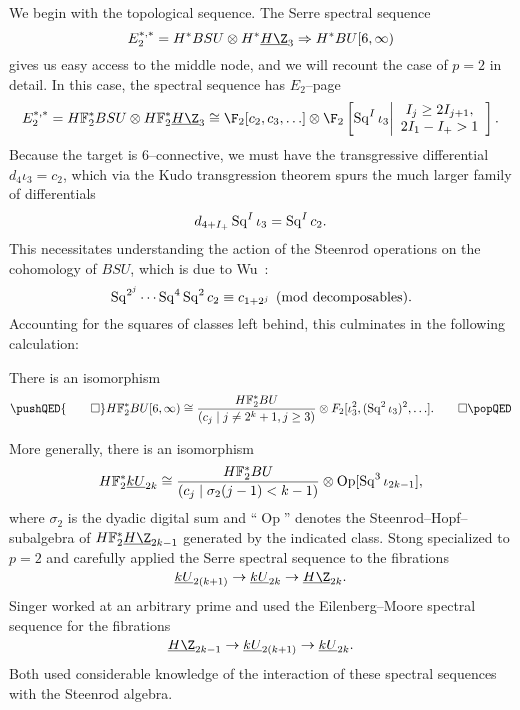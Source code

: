 We begin with the topological sequence.  The Serre spectral sequence \[E_2^{*, *} = H^* BSU \otimes H^* \OS{H\Z}{3} \Rightarrow H^* BU[6, \infty)\] gives us easy access to the middle node, and we will recount the case of $p = 2$ in detail.  In this case, the spectral sequence has $E_2$--page \[E_2^{*, *} = \HFtwo^* BSU \otimes \HFtwo^* \OS{H\Z}{3} \cong \F_2[c_2, c_3, \ldots] \otimes \F_2\left[\Sq^I \iota_3 \middle| \begin{array}{c} I_j \ge 2I_{j+1}, \\ 2 I_1 - I_+ > 1 \end{array}\right].\]  Because the target is $6$--connective, we must have the transgressive differential $d_4 \iota_3 = c_2$, which via the Kudo transgression theorem spurs the much larger family of differentials \[d_{4+I_+} \operatorname{Sq}^I \iota_3 = \operatorname{Sq}^I c_2.\]  This necessitates understanding the action of the Steenrod operations on the cohomology of $BSU$, which is due to Wu~\cite[Section 23.6]{MayConciseCourse}: \[\operatorname{Sq}^{2^j} \cdots \operatorname{Sq}^4 \operatorname{Sq}^2 c_2 \equiv c_{1 + 2^j} \pmod{\text{decomposables}}.\]  Accounting for the squares of classes left behind, this culminates in the following calculation:

\begin{theorem}\label{HF2BU6Calculation}
There is an isomorphism
\[\pushQED{\qed}
\HFtwo^* BU[6, \infty) \cong \frac{\HFtwo^* BU}{(c_j \mid j \ne 2^k + 1, j \ge 3)} \otimes F_2[\iota_3^2, (\Sq^2 \iota_3)^2, \ldots]. \qedhere
\popQED\]
\end{theorem}

\begin{remark}
More generally, there is an isomorphism \[\HFtwo^* \OS{kU}{2k} \cong \frac{\HFtwo^* BU}{(c_j \mid \sigma_2(j - 1) < k - 1)} \otimes \operatorname{Op}[\Sq^3 \iota_{2k-1}],\] where $\sigma_2$ is the dyadic digital sum and ``$\operatorname{Op}$'' denotes the Steenrod--Hopf--subalgebra of $\HFtwo^* \OS{H\Z}{2k-1}$ generated by the indicated class.  Stong specialized to $p = 2$ and carefully applied the Serre spectral sequence to the fibrations \[\OS{kU}{2(k+1)} \to \OS{kU}{2k} \to \OS{H\Z}{2k}.\]  Singer worked at an arbitrary prime and used the Eilenberg--Moore spectral sequence for the fibrations \[\OS{H\Z}{2k-1} \to \OS{kU}{2(k+1)} \to \OS{kU}{2k}.\]  Both used considerable knowledge of the interaction of these spectral sequences with the Steenrod algebra.
\end{remark}

